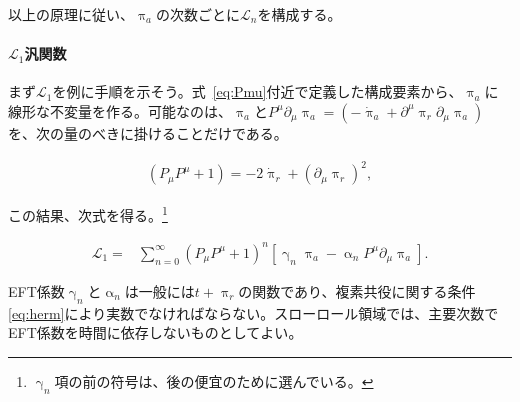 \documentclass[a4paper,11pt]{ltjsarticle}
\numberwithin{equation}{section}
\newcommand{\Eq}[1]{Eq.~(\ref{#1})}
\renewcommand{\Eq}[1]{式~\eqref{#1}}
\begin{document}
以上の原理に従い、$\uppi_a$の次数ごとに$\mathcal{L}_n$を構成する。

\paragraph{$\mathcal{L}_1$汎関数}

まず$\mathcal{L}_1$を例に手順を示そう。\Eq{eq:Pmu}付近で定義した構成要素から、$\uppi_a$に線形な不変量を作る。可能なのは、$\uppi_a$と$P^\mu\partial_\mu\uppi_a=(-\dot{\uppi}_a+\partial^\mu\uppi_r\partial_\mu\uppi_a)$を、次の量のべきに掛けることだけである。

\begin{align}
        \left( P_\mu P^\mu  +1\right) = -2 \dot{\uppi}_{r} + \left( \partial_\mu \uppi_{r}\right)^2,
    \end{align}

この結果、次式を得る\cite{Hongo:2018ant}。\footnote{$\upgamma_n$項の前の符号は、後の便宜のために選んでいる。}

\begin{align}
        \mathcal{L}_1 = & \sum_{n=0}^\infty \left( P_\mu P^\mu  +1\right)^{n} \left[ \upgamma_n \uppi_{a} -\upalpha_n P^\mu \partial_\mu \uppi_{a}  \right].
    \end{align}

EFT係数$\upgamma_n$と$\upalpha_n$は一般には$t+\uppi_r$の関数であり、複素共役に関する条件\eqref{eq:herm}により実数でなければならない。スローロール領域では、主要次数でEFT係数を時間に依存しないものとしてよい\cite{Hongo:2018ant}。
\end{document}

